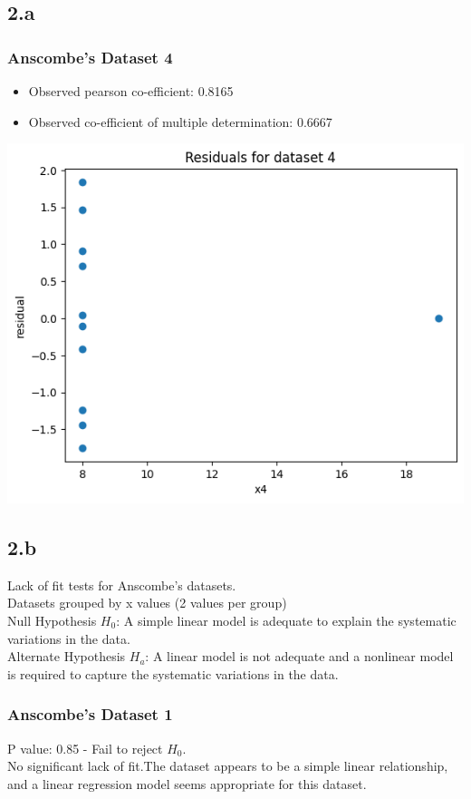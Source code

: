 \documentclass[12pt]{article}
\begin{document}
\newpage
\subsection*{2.a}
\subsubsection*{Anscombe's Dataset 4}
\begin{itemize}
    \item Observed pearson co-efficient: 0.8165
    \item Observed co-efficient of multiple determination: 0.6667
\end{itemize}
\includegraphics*[width=\linewidth]{graph2a4}

\newpage
\subsection*{2.b}
Lack of fit tests for Anscombe's datasets.
\\
Datasets grouped by x values (2 values per group)
\\[\baselineskip]
Null Hypothesis \(H_0\): A simple linear model is adequate to explain the systematic
variations in the data.
\\[\baselineskip]
Alternate Hypothesis \(H_a\): A linear model is not adequate and a nonlinear model
is required to capture the systematic variations in the data.

\subsubsection*{Anscombe's Dataset 1}
P value: 0.85 - Fail to reject \(H_0\).
\\
No significant lack of fit.The dataset appears to be a simple linear relationship,
and a linear regression model seems appropriate for this dataset.
\end{document}
